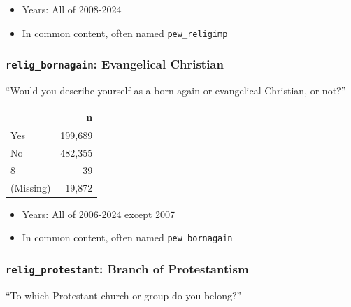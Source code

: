 \documentclass[10pt,article,oneside]{memoir}
\begin{document}
\begin{itemize}
\tightlist
\item
  Years: All of 2008-2024
\item
  In common content, often named \texttt{pew\_religimp}
\end{itemize}

\subsubsection{\texorpdfstring{\texttt{relig\_bornagain}: Evangelical
Christian}{relig\_bornagain: Evangelical Christian}}\label{relig_bornagain-evangelical-christian}

``Would you describe yourself as a born-again or evangelical Christian,
or not?''

\begin{table}[H]
\centering
\begin{tabular}[t]{lr}
\toprule
 & n\\
\midrule
Yes & 199,689\\
No & 482,355\\
8 & 39\\
(Missing) & 19,872\\
\bottomrule
\end{tabular}
\end{table}

\begin{itemize}
\tightlist
\item
  Years: All of 2006-2024 except 2007
\item
  In common content, often named \texttt{pew\_bornagain}
\end{itemize}

\subsubsection{\texorpdfstring{\texttt{relig\_protestant}: Branch of
Protestantism}{relig\_protestant: Branch of Protestantism}}\label{relig_protestant-branch-of-protestantism}

``To which Protestant church or group do you belong?''
\end{document}
